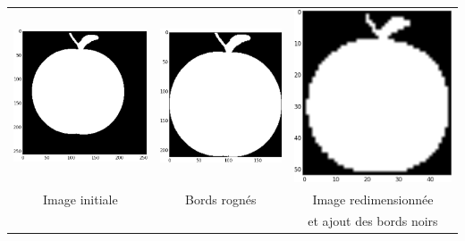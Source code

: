 \documentclass[a4paper,10pt]{article} %
\theoremstyle{definition} %
\begin{document}
\begin{center}
  \begin{tabular}{c c c}
     \includegraphics[scale=0.25]{pictures/apple.png} & \includegraphics[scale=0.25]{pictures/apple-crop.png} & \includegraphics[scale=0.25]{pictures/apple-normalize.png} \\
    Image initiale & Bords rognés & Image redimensionnée  \\
                          &                        &  et ajout des bords noirs
      \end{tabular}
\end{center}



\end{document}
